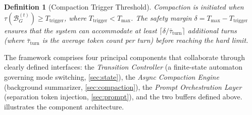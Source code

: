 \documentclass[10pt,twocolumn]{article}
\newtheorem{definition}{Definition}
\newcommand{\bufG}{\mathcal{B}_G}
\newcommand{\Dtok}{\tau}
\newcommand{\Tmax}{T_{\max}}
\newcommand{\Ttrig}{T_{\mathrm{trigger}}}
\begin{document}
\begin{definition}[Compaction Trigger Threshold]\label{def:trigger}
  Compaction is initiated when $\Dtok(\bufG^{(t)}) \geq \Ttrig$, where $\Ttrig < \Tmax$. The \emph{safety margin} $\delta = \Tmax - \Ttrig$ ensures that the system can accommodate at least $\lceil \delta / \bar{\Dtok}_{\mathrm{turn}} \rceil$ additional turns (where $\bar{\Dtok}_{\mathrm{turn}}$ is the average token count per turn) before reaching the hard limit.
\end{definition}

The framework comprises four principal components that collaborate through clearly defined interfaces: the \emph{Transition Controller} (a finite-state automaton governing mode switching, \cref{sec:state}), the \emph{Async Compaction Engine} (background summarizer, \cref{sec:compaction}), the \emph{Prompt Orchestration Layer} (separation token injection, \cref{sec:prompt}), and the two buffers defined above.  illustrates the component architecture.
\end{document}
